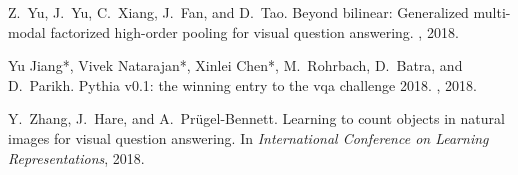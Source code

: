 \documentclass[10pt,twocolumn,letterpaper]{article}
\begin{document}
\begin{thebibliography}{10}
Z.~Yu, J.~Yu, C.~Xiang, J.~Fan, and D.~Tao.
\newblock Beyond bilinear: Generalized multi-modal factorized high-order
  pooling for visual question answering.
,
  2018.

{Yu Jiang*}, {Vivek Natarajan*}, {Xinlei Chen*}, M.~Rohrbach, D.~Batra, and
  D.~Parikh.
\newblock Pythia v0.1: the winning entry to the vqa challenge 2018.
, 2018.

Y.~Zhang, J.~Hare, and A.~Prügel-Bennett.
\newblock Learning to count objects in natural images for visual question
  answering.
\newblock In {\em International Conference on Learning Representations}, 2018.

\end{thebibliography}
 
\end{document}
